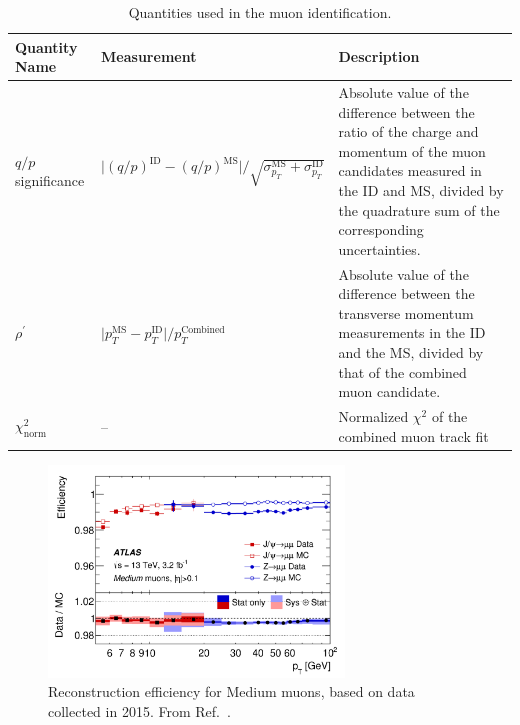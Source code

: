 \begin{table}[!htb]
    \begin{center}
        \caption{
            Quantities used in the muon identification.
        }
        \label{tab:muon_id_vars}
        \begin{tabularx}{\textwidth}{l|X|X}
        \hline
        \hline
        \textbf{Quantity Name} & \textbf{Measurement} & \textbf{Description} \\
        \hline
        $q/p$ significance & $\lvert (q/p)^{\text{ID}} - (q/p)^{\text{MS}} \rvert / \sqrt{ \sigma_{p_T}^{\text{MS}} + \sigma_{p_T}^{\text{ID}}}$ &
                Absolute value of the difference between the ratio of the charge and momentum of the muon candidates measured in the ID and MS,
                divided by the quadrature sum of the corresponding uncertainties. \\
        \hline
        $\rho^{\prime}$ & $\lvert p_T^{\text{MS}} - p_T^{\text{ID}} \rvert / p_T^{\text{Combined}}$ &
                Absolute value of the difference between the transverse momentum measurements in the ID and the MS,
                divided by that of the combined muon candidate. \\
        \hline
        $\chi^2_{\text{norm}}$ & -- & Normalized $\chi^2$ of the combined muon track fit \\
        \hline
        \hline
        \end{tabularx}
    \end{center}
\end{table}

\begin{figure}[!htb]
    \begin{center}
        \includegraphics[width=0.7\textwidth]{figures/chapter3/muon/muon_reco_eff_medium}
        \caption{
            Reconstruction efficiency for Medium muons, based on data collected in 2015.
            From Ref.~\cite{Aad:2016jkr}.
        }
        \label{fig:muon_reco_eff}
    \end{center}
\end{figure}


